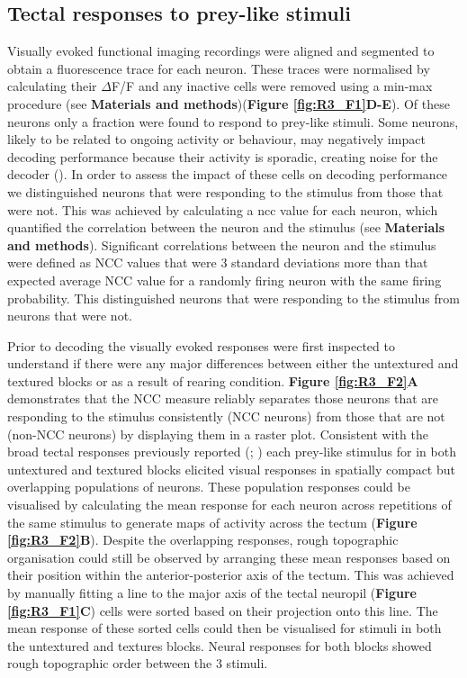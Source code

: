 \subsection{Tectal responses to prey-like stimuli}
Visually evoked functional imaging recordings were aligned and segmented to obtain a fluorescence trace for each neuron. These traces were normalised by calculating their $\Delta$F/F and any inactive cells were removed using a min-max procedure (see \textbf{Materials and methods})(\textbf{Figure \ref{fig:R3_F1}D-E}). Of these neurons only a fraction were found to respond to prey-like stimuli. Some neurons, likely to be related to ongoing activity or behaviour, may negatively impact decoding performance because their activity is sporadic, creating noise for the decoder (\cite{Kahn2015ANeurons}). In order to assess the impact of these cells on decoding performance we distinguished neurons that were responding to the stimulus from those that were not. This was achieved by calculating a \gls{ncc} value for each neuron, which quantified the correlation between the neuron and the stimulus (see \textbf{Materials and methods}). Significant correlations between the neuron and the stimulus were defined as NCC values that were 3 standard deviations more than that expected average NCC value for a randomly firing neuron with the same firing probability. This distinguished neurons that were responding to the stimulus from neurons that were not.

Prior to decoding the visually evoked responses were first inspected to understand if there were any major differences between either the untextured and textured blocks or as a result of rearing condition. \textbf{Figure \ref{fig:R3_F2}A} demonstrates that 
 the NCC measure reliably separates those neurons that are responding to the stimulus consistently (NCC neurons) from those that are not (non-NCC neurons) by displaying them in a raster plot. Consistent with the broad tectal responses previously reported  (\cite{Niell2005FunctionalTectum}; \cite{Romano2015}) each prey-like stimulus for in both untextured and textured blocks elicited visual responses in spatially compact but overlapping populations of neurons. These population responses could be visualised by calculating the mean response for each neuron across repetitions of the same stimulus to generate maps of activity across the tectum (\textbf{Figure \ref{fig:R3_F2}B}). Despite the overlapping responses, rough topographic organisation could still be observed by arranging these mean responses based on their position within the anterior-posterior axis of the tectum. This was achieved by manually fitting a line to the major axis of the tectal neuropil (\textbf{Figure \ref{fig:R3_F1}C}) cells were sorted based on their projection onto this line. The mean response of these sorted cells could then be visualised for stimuli in both the untextured and textures blocks. Neural responses for both blocks showed rough topographic order between the 3 stimuli. 

